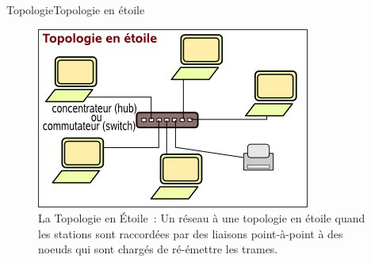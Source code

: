 \documentclass{beamer}
\begin{document}
	\begin{frame}{Topologie}{Topologie en étoile}
		\begin{figure} 
			\includegraphics[scale = 0.7]{Etoile.jpg}\\
			La Topologie en Étoile : Un réseau à une topologie en étoile quand les stations sont raccordées par des liaisons point-à-point à des noeuds qui sont chargés de ré-émettre les trames.
		\end{figure}
	\end{frame}
\end{document}
